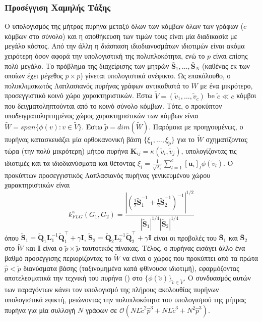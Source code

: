 \subsubsection{Προσέγγιση Χαμηλής Τάξης}
Ο υπολογισμός της μήτρας πυρήνα μεταξύ όλων των κόμβων όλων των γράφων ($c$ κόμβων στο σύνολο) και η αποθήκευση των τιμών τους είναι μία διαδικασία με μεγάλο κόστος.
Από την άλλη η διάσπαση ιδιοδιανυσμάτων ιδιοτιμών είναι ακόμα χειρότερη όσον αφορά την υπολογιστική της πολυπλοκότητα, ενώ το $p$ είναι επίσης πολύ μεγάλο.
Το πρόβλημα της διαχείρισης των μητρών $\bar{\mathbf{S}}_1, \ldots, \bar{\mathbf{S}}_N$ (καθένας εκ των οποίων έχει μέγεθος $p \times p$) γίνεται υπολογιστικά ανέφικτο.
Ως επακόλουθο, ο πολυκλιμακωτός Λαπλασιανός πυρήνας γράφων αντικαθιστά το $W$ με ένα μικρότερο, προσεγγιστικό κοινό χώρο χαρακτηριστικών.
Έστω $\tilde{V} = (\tilde{v}_1, \ldots, \tilde{v}_{\tilde{c}})$ be $\tilde{c} \ll c$ κόμβοι που δειγματοληπτούνται από το κοινό σύνολο κόμβων.
Τότε, ο προκύπτον υποδειγματοληπτημένος χώρος χαρακτηριστικών των κόμβων είναι $\tilde{W} = span \{ \phi(v) : v \in \tilde{V} \}$.
Έστω $\tilde{p} = dim(\tilde{W})$.
Παρόμοια με προηγουμένως, ο πυρήνας κατασκευάζει μία ορθοκανονική βάση $\{ \xi_1, \ldots, \xi_{\tilde{p}} \}$ για το $\tilde{W}$ σχηματίζοντας τώρα (την πολύ μικρότερη) μήτρα πυρήνα $\mathbf{K}_{ij} = \kappa(\tilde{v}_i, \tilde{v}_j)$, υπολογίζοντας τις ιδιοτιμές και τα ιδιοδιανύσματα και θέτοντας $\xi_i = \frac{1}{\sqrt{\lambda_i}} \sum_{l=1}^{\tilde{c}} [\mathbf{u}_i]_l \phi(\tilde{v}_l)$. 
Ο προκύπτων προσεγγιστικός Λαπλασιανός πυρήνας γενικευμένου χώρου χαρακτηριστικών είναι
\begin{equation*}
    k_{FLG}^\kappa(G_1, G_2) = \frac{| (\frac{1}{2} \tilde{\mathbf{S}}_1^{-1} + \frac{1}{2} \tilde{\mathbf{S}}_2^{-1} )^{-1} |^{1/2}}{|\tilde{\mathbf{S}}_1|^{1/4} |\tilde{\mathbf{S}}_2|^{1/4}} 
\end{equation*}
όπου $\tilde{\mathbf{S}}_1 = \tilde{\mathbf{Q}}_1 \mathbf{L}_1^{-1} \tilde{\mathbf{Q}}_1^\top + \gamma \mathbf{I}$, $\tilde{\mathbf{S}}_2 = \tilde{\mathbf{Q}}_2 \mathbf{L}_2^{-1} \tilde{\mathbf{Q}}_2^\top + \gamma \mathbf{I}$ είναι οι προβολές του $\bar{\mathbf{S}}_1$ και $\bar{\mathbf{S}}_2$ στο $\tilde{W}$ και $\mathbf{I}$ είναι ο $\tilde{p} \times \tilde{p}$ ταυτοτικός πίνακας.
Τέλος, ο πυρήνας εισάγει άλλο ένα βαθμό προσέγγισης περιορίζοντας το $\tilde{W}$ να είναι ο χώρος που προκύπτει από τα πρώτα $\hat{p} < \tilde{p}$ διανύσματα βάσης (ταξινομημένα κατά φθίνουσα ιδιοτιμή), εφαρμόζοντας αποτελεσματικά την τεχνική του  πυρήνα () στο $\{ \phi(\tilde{v}) \}_{\tilde{v} \in \tilde{V}}$.
Ο συνδυασμός αυτών των παραγόντων κάνει τον υπολογισμό της πλήρους ακολουθίας πυρήνων υπολογιστικά εφικτή, μειώνοντας την πολυπλοκότητα του υπολογισμού της μήτρας πυρήνα για μία συλλογή $N$ γράφων σε $\mathcal{O}(NL \tilde{c}^2 \hat{p}^3 + NL \tilde{c}^3 + N^2 \hat{p}^3)$.

